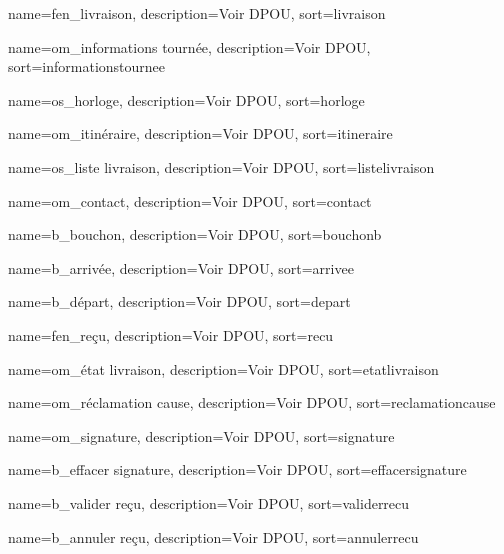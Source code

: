 {
	name={fen\_livraison},
	description={Voir \textsc{DPOU}},
	sort={livraison}
}

{
	name={om\_informations tournée},
	description={Voir \textsc{DPOU}},
	sort={informationstournee}
}

{
	name={os\_horloge},
	description={Voir \textsc{DPOU}},
	sort={horloge}
}

{
	name={om\_itinéraire},
	description={Voir \textsc{DPOU}},
	sort={itineraire}
}

{
	name={os\_liste livraison},
	description={Voir \textsc{DPOU}},
	sort={listelivraison}
}

{
	name={om\_contact},
	description={Voir \textsc{DPOU}},
	sort={contact}
}

{
	name={b\_bouchon},
	description={Voir \textsc{DPOU}},
	sort={bouchonb}
}

{
	name={b\_arrivée},
	description={Voir \textsc{DPOU}},
	sort={arrivee}
}

{
	name={b\_départ},
	description={Voir \textsc{DPOU}},
	sort={depart}
}

{
	name={fen\_reçu},
	description={Voir \textsc{DPOU}},
	sort={recu}
}

{
	name={om\_état livraison},
	description={Voir \textsc{DPOU}},
	sort={etatlivraison}
}

{
	name={om\_réclamation cause},
	description={Voir \textsc{DPOU}},
	sort={reclamationcause}
}

{
	name={om\_signature},
	description={Voir \textsc{DPOU}},
	sort={signature}
}

{
	name={b\_effacer signature},
	description={Voir \textsc{DPOU}},
	sort={effacersignature}
}

{
	name={b\_valider reçu},
	description={Voir \textsc{DPOU}},
	sort={validerrecu}
}

{
	name={b\_annuler reçu},
	description={Voir \textsc{DPOU}},
	sort={annulerrecu}
}

